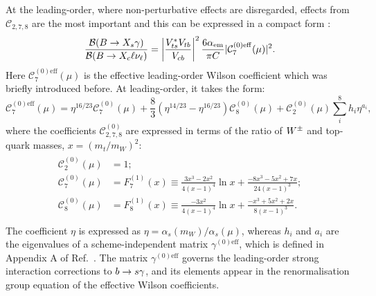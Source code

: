 At the leading-order, where non-perturbative effects are disregarded, effects from $\mathcal{C}_{2,7,8}$ are the most important and this can be expressed in a compact form \cite{Buras:1993xp}:
\begin{equation}\label{eq:total_decay_rate_leading_order}
    \frac{\mathcal{B}(\BtoXsgamma)}{\mathcal{B}(\B\to X_c\ell\nu_\ell)} = \left|\frac{V_{ts}^*V_{tb}}{V_{cb}}\right|^2\frac{6\alpha_{\mathrm{em}}}{\pi C}|\mathcal{C}_{7}^{(0)\mathrm{eff}}(\mu)|^2.
\end{equation}
Here $\mathcal{C}_{7}^{(0)\mathrm{eff}}(\mu)$ is the effective leading-order Wilson coefficient which was briefly introduced before.
At leading-order, it takes the form:
\begin{equation}\label{eq:effective_c7}
    \mathcal{C}_{7}^{(0)\mathrm{eff}}(\mu) = \eta^{16/23}\mathcal{C}^{(0)}_7(\mu) + \frac{8}{3} \left(\eta^{14/23}-\eta^{16/23}\right)\mathcal{C}^{(0)}_8(\mu) + \mathcal{C}^{(0)}_2(\mu) \sum_i^8h_i\eta^{a_i},
\end{equation}
where the \SM coefficients $\mathcal{C}_{2,7,8}^{(0)}$ are expressed in terms of the ratio of $W^\pm$ and top-quark masses, $x=(m_t/m_W)^2$:
\begin{align}\label{eq:leading_order_wilson_coeffs}
    \begin{split}
        \mathcal{C}_2^{(0)}(\mu) &= 1;\\
        \mathcal{C}_7^{(0)}(\mu) &= F_7^{(1)}(x) \equiv \frac{3x^3-2x^2}{4(x-1)^4}\ln x + \frac{-8x^3-5x^2+7x}{24(x-1)^3};\\
        \mathcal{C}_8^{(0)}(\mu) &= F_8^{(1)}(x) \equiv \frac{-3x^2}{4(x-1)^4}\ln x + \frac{-x^3+5x^2+2x}{8(x-1)^3}.\\
    \end{split}
\end{align}
The coefficient $\eta$ is expressed as $\eta=\alpha_s(m_W)/\alpha_s(\mu)$, whereas $h_i$ and $a_i$ are the eigenvalues of a scheme-independent matrix $\gamma^{(0)\mathrm{eff}}$, 
which is defined in Appendix A of Ref.~\cite{Buras:1993xp}.
The matrix $\gamma^{(0)\mathrm{eff}}$ governs the leading-order strong interaction corrections to $b\rightarrow s\gamma$, and its elements appear in the renormalisation group equation of the effective Wilson coefficients.

